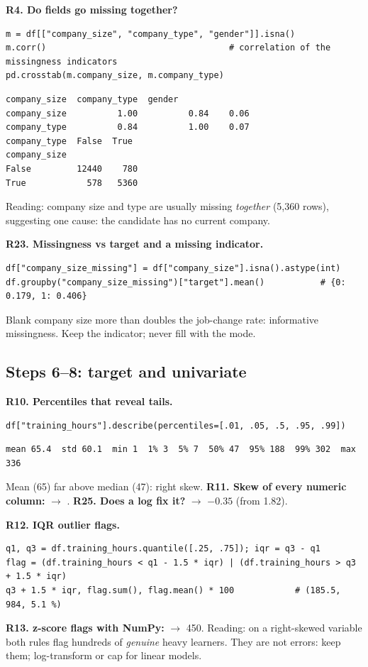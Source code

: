 \textbf{R4. Do fields go missing together?}
\begin{lstlisting}
m = df[["company_size", "company_type", "gender"]].isna()
m.corr()                                    # correlation of the missingness indicators
pd.crosstab(m.company_size, m.company_type)
\end{lstlisting}
\outlabel
\begin{lstlisting}[style=out]
              company_size  company_type  gender
company_size          1.00          0.84    0.06
company_type          0.84          1.00    0.07
company_type  False  True
company_size
False         12440    780
True            578   5360
\end{lstlisting}
Reading: company size and type are usually missing \emph{together} (5{,}360 rows), suggesting one cause: the candidate has no current company.

\textbf{R23. Missingness vs target and a missing indicator.}
\begin{lstlisting}
df["company_size_missing"] = df["company_size"].isna().astype(int)
df.groupby("company_size_missing")["target"].mean()           # {0: 0.179, 1: 0.406}
\end{lstlisting}
Blank company size more than doubles the job-change rate: informative missingness. Keep the indicator; never fill with the mode.

\subsection{Steps 6--8: target and univariate}
\textbf{R10. Percentiles that reveal tails.}
\begin{lstlisting}
df["training_hours"].describe(percentiles=[.01, .05, .5, .95, .99])
\end{lstlisting}
\outlabel
\begin{lstlisting}[style=out]
mean 65.4  std 60.1  min 1  1% 3  5% 7  50% 47  95% 188  99% 302  max 336
\end{lstlisting}
Mean (65) far above median (47): right skew.
\textbf{R11. Skew of every numeric column:}  $\to$ .
\textbf{R25. Does a log fix it?}  $\to$ $-0.35$ (from 1.82).

\textbf{R12. IQR outlier flags.}
\begin{lstlisting}
q1, q3 = df.training_hours.quantile([.25, .75]); iqr = q3 - q1
flag = (df.training_hours < q1 - 1.5 * iqr) | (df.training_hours > q3 + 1.5 * iqr)
q3 + 1.5 * iqr, flag.sum(), flag.mean() * 100            # (185.5, 984, 5.1 %)
\end{lstlisting}
\textbf{R13. z-score flags with NumPy:}  $\to$ 450.
Reading: on a right-skewed variable both rules flag hundreds of \emph{genuine} heavy learners. They are not errors: keep them; log-transform or cap for linear models.

